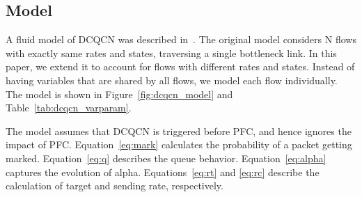 \subsection{Model}

A fluid model of DCQCN was described in~\cite{dcqcn}. The original model
considers N flows with exactly same rates and states, traversing a single
bottleneck link.  In this paper, we extend it to account for flows with
different rates and states.  Instead of having variables that are shared by all
flows, we model each flow individually. The model is shown in
Figure~\ref{fig:dcqcn_model} and Table~\ref{tab:dcqcn_varparam}.

The model assumes that DCQCN is triggered before PFC, and hence ignores the
impact of PFC. Equation~\ref{eq:mark} calculates the probability of a packet
getting marked.  Equation~\ref{eq:q} describes the queue behavior.
Equation~\ref{eq:alpha} captures the evolution of alpha.  Equations~\ref{eq:rt}
and \ref{eq:rc} describe the calculation of target and sending rate,
respectively. 

